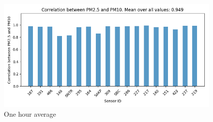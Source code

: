\documentclass[12pt,a4paper,twoside]{scrartcl}
\numberwithin{equation}{section}
\newcounter{mypagecount}%
\newenvironment{interlude}{%
  \clearpage
  \setcounter{mypagecount}{\value{page}}%
  \thispagestyle{empty}%
  \pagestyle{empty}%
}{%
  \clearpage
  \setcounter{page}{\value{mypagecount}}%
}
\begin{document}
\begin{interlude}
\begin{appendices}
\begin{center}
      \begin{figure}[H]
        \centerline{\includegraphics[width=1\textwidth]{figures/data_files_changes/1H_P1_P2_correlation}}
        \caption[PM2.5-PM10 correlation (one hour average)]{One hour average}
      \end{figure}
      
    \end{center}
    \clearpage

\end{appendices}
\end{interlude}
\end{document}
